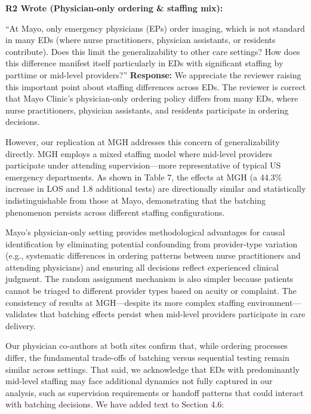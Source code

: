 \documentclass[11pt]{article}
\newenvironment{quote2}
{ \bigskip
\noindent
         \small\em
         \baselineskip=14pt
}
\newcommand{\1}{\hbox{\rm 1\kern-.35em 1}}
\begin{document}
{\color{black}

\begin{quote2}
\textbf{R2 Wrote (Physician‑only ordering \& staffing mix):}  

\noindent``At Mayo, only emergency physicians (EPs) order imaging,
which is not standard in many EDs (where nurse practitioners, physician assistants, or
residents contribute). Does this limit the generalizability to other care settings? How
does this difference manifest itself particularly in EDs with significant staffing by parttime
or mid-level providers?” 
\end{quote2}

\noindent\textbf{Response:} \color{blue}We appreciate the reviewer raising this important point about staffing differences across EDs. The reviewer is correct that Mayo Clinic's physician-only ordering policy differs from many EDs, where nurse practitioners, physician assistants, and residents participate in ordering decisions.

However, our replication at MGH addresses this concern of generalizability directly. MGH employs a mixed staffing model where mid-level providers participate under attending supervision—more representative of typical US emergency departments. As shown in Table 7, the effects at MGH (a 44.3\% increase in LOS and 1.8 additional tests) are directionally similar and statistically indistinguishable from those at Mayo, demonstrating that the batching phenomenon persists across different staffing configurations.

Mayo's physician-only setting provides methodological advantages for causal identification by eliminating potential confounding from provider-type variation (e.g., systematic differences in ordering patterns between nurse practitioners and attending physicians) and ensuring all decisions reflect experienced clinical judgment. The random assignment mechanism is also simpler because patients cannot be triaged to different provider types based on acuity or complaint. The consistency of results at MGH—despite its more complex staffing environment—validates that batching effects persist when mid-level providers participate in care delivery.

Our physician co-authors at both sites confirm that, while ordering processes differ, the fundamental trade-offs of batching versus sequential testing remain similar across settings. That said, we acknowledge that EDs with predominantly mid-level staffing may face additional dynamics not fully captured in our analysis, such as supervision requirements or handoff patterns that could interact with batching decisions. We have added text to Section 4.6:

}
\end{document}
